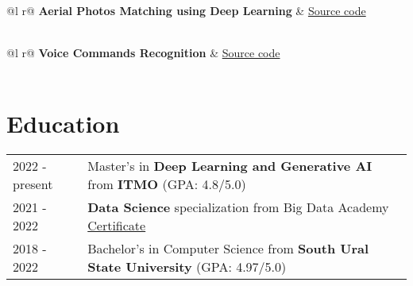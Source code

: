 \documentclass[a4paper,12pt]{article}
\begin{document}
\begin{tabularx}{\linewidth}{ @{}l r@{} }
\textbf{Aerial Photos Matching using Deep Learning} & \hfill \href{https://github.com/traptrip/ai-areal-photo}{Source code} \\[3.75pt]
  \\
\end{tabularx}

\begin{tabularx}{\linewidth}{ @{}l r@{} }
\textbf{Voice Commands Recognition} & \hfill \href{https://github.com/traptrip/Speech_commands_recognition}{Source code} \\[3.75pt]
  \\
\end{tabularx}


\section{Education}
\begin{tabularx}{\linewidth}{@{}l X@{}}	
2022 - present & Master's in \textbf{Deep Learning and Generative AI} from \textbf{ITMO} \hfill \normalsize (GPA: 4.8/5.0) \\
2021 - 2022 & \textbf{Data Science} specialization from Big Data Academy \hfill \normalsize \href{https://data.vk.company/curriculum/certificates/download/5013/d55bb369-58ba-46e3-b9e3-9202797b0bee/}{Certificate}\\
2018 - 2022 & Bachelor's in Computer Science from \textbf{South Ural State University} \hfill \normalsize  (GPA: 4.97/5.0) \\ 

\end{tabularx}



\end{document}
